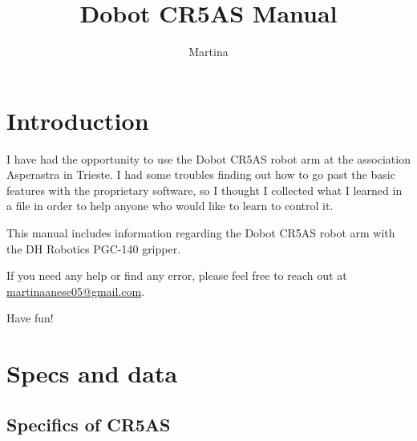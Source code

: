 \documentclass[11pt,a4paper]{article}
\title{\textbf{Dobot CR5AS Manual}}
\author{Martina}
\date{}
\begin{document}
\maketitle
\tableofcontents
\newpage

\section{Introduction}
\label{sec:introduction}

I have had the opportunity to use the Dobot CR5AS robot arm at the association Asperastra in Trieste. I had some troubles finding out how to go past the basic features with the proprietary software, so I thought I collected what I learned in a file in order to help anyone who would like to learn to control it.

This manual includes information regarding the Dobot CR5AS robot arm with the DH Robotics PGC-140 gripper.

If you need any help or find any error, please feel free to reach out at \href{mailto:martinaanese05@gmail.com}{martinaanese05@gmail.com}.

Have fun!

\section{Specs and data}
\label{sec:specs}

\subsection{Specifics of CR5AS}
\label{sec:specs-cr5as}
\end{document}
